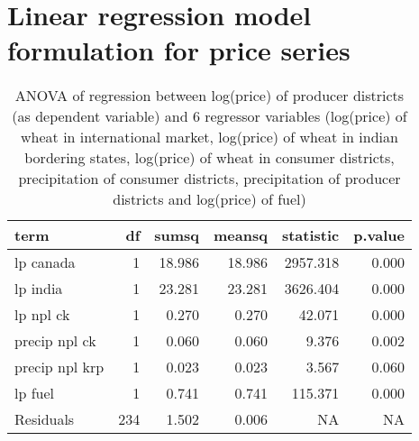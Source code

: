 \documentclass[
  12pt,
]{article}
\begin{document}
\hypertarget{linear-regression-model-formulation-for-price-series}{%
\section{Linear regression model formulation for price series}\label{linear-regression-model-formulation-for-price-series}}

\begin{table}[H]

\caption{\label{tab:lm1-without-time-producer}ANOVA of regression between log(price) of producer districts (as dependent variable) and 6 regressor variables (log(price) of wheat in international market, log(price) of wheat in indian bordering states, log(price) of wheat in consumer districts, precipitation of consumer districts, precipitation of producer districts and log(price) of fuel)}
\centering
\begin{tabular}[t]{>{\raggedright\arraybackslash}p{7em}rrrrr}
\toprule
term & df & sumsq & meansq & statistic & p.value\\
\midrule
lp canada & 1 & 18.986 & 18.986 & 2957.318 & 0.000\\
lp india & 1 & 23.281 & 23.281 & 3626.404 & 0.000\\
lp npl ck & 1 & 0.270 & 0.270 & 42.071 & 0.000\\
precip npl ck & 1 & 0.060 & 0.060 & 9.376 & 0.002\\
precip npl krp & 1 & 0.023 & 0.023 & 3.567 & 0.060\\
\addlinespace
lp fuel & 1 & 0.741 & 0.741 & 115.371 & 0.000\\
Residuals & 234 & 1.502 & 0.006 & NA & NA\\
\bottomrule
\end{tabular}
\end{table}
\end{document}
